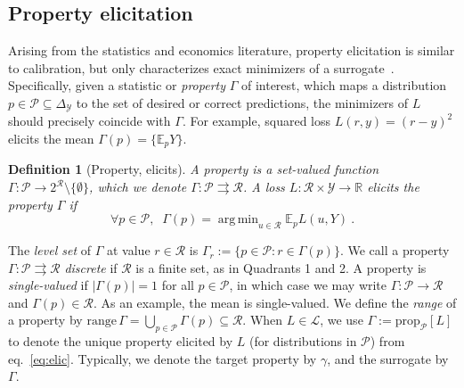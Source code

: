 \documentclass{article} %
\newcommand{\Comments}{0}
\newcommand{\mytodo}[2]{\ifnum\Comments=1%
	\todo[linecolor=#1!80!black,backgroundcolor=#1,bordercolor=#1!80!black]{#2}\fi}
\newcommand{\raft}[1]{\mytodo{green!20!white}{RF: #1}}
\newcommand{\jessiet}[1]{\mytodo{teal!20!white}{JF: #1}}
\newcommand{\reals}{\mathbb{R}}
\newcommand{\simplex}{\Delta_\Y}
\newcommand{\prop}[2][\mathcal{P}]{\mathrm{prop}_{#1}[#2]}
\newcommand{\range}{\mathrm{range}\,}
\newcommand{\E}{\mathbb{E}}
\renewcommand{\L}{\mathcal{L}}
\newcommand{\R}{\mathcal{R}}
\renewcommand{\P}{\mathcal{P}}
\newcommand{\Y}{\mathcal{Y}}
\newcommand{\exploss}[3]{\E_{#3} #1(#2,Y)}
\newcommand{\toto}{\rightrightarrows}
\newtheorem{definition}{Definition}
\DeclareMathOperator*{\argmin}{arg\,min}
\begin{document}
\subsection{Property elicitation}\label{subsec:properties}
Arising from the statistics and economics literature, property elicitation is similar to calibration, but only characterizes exact minimizers of a surrogate~\citep{savage1971elicitation,osband1985information-eliciting,lambert2008eliciting,lambert2009eliciting,lambert2018elicitation,frongillo2015vector-valued,frongillo2014general}.
Specifically, given a statistic or \emph{property} $\Gamma$ of interest, which maps a distribution $p \in \P \subseteq \simplex$ to the set of desired or correct predictions, the minimizers of $L$ should precisely coincide with $\Gamma$.
For example, squared loss $L(r,y) = (r-y)^2$ elicits the mean $\Gamma(p) = \{\E_p Y\}$.

\begin{definition}[Property, elicits]
	A \emph{property} is a set-valued function $\Gamma : \P \to 2^\R \setminus \{\emptyset\}$, which we denote $\Gamma: \P \toto \R$.
	A loss $L : \R \times \Y \to \reals$ \emph{elicits} the property $\Gamma$ if
	\begin{equation}
    \label{eq:elic}    
    \forall p \in \P, \;\; \Gamma(p) = \argmin_{u \in \R} \exploss{L}{u}{p}~.
	\end{equation}
\end{definition}
The \emph{level set} of $\Gamma$ at value $r\in\R$ is $\Gamma_r := \{p \in \P : r \in \Gamma(p)\}$.
We call a property $\Gamma: \P \toto \R$ \emph{discrete} if $\R$ is a finite set, as in Quadrants 1 and 2.
A property is \emph{single-valued} if $|\Gamma(p)|=1$ for all $p\in\P$, in which case we may write $\Gamma:\P\to\R$ and $\Gamma(p) \in \R$.
As an example, the mean is single-valued.
We define the \emph{range} of a property by $\range \Gamma = \bigcup_{p\in\P} \Gamma(p) \subseteq \R$.
When $L\in\L$, we use $\Gamma := \prop[\P]{L}$ to denote the unique property elicited by $L$ (for distributions in $\P$) from eq.~\eqref{eq:elic}. 
Typically, we denote the target property by $\gamma$, and the surrogate by $\Gamma$.
\end{document}
